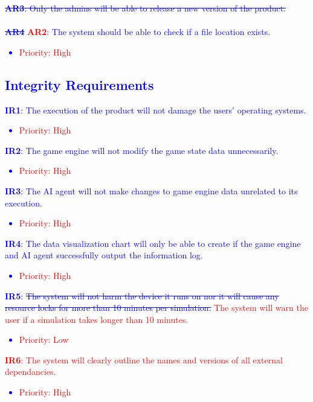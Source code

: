 \documentclass{article}
\begin{document}
\textcolor{blue}{\sout{\textbf{AR3}: Only the admins will be able to release a new version of the product.}\\\\
\textcolor{blue}{\sout{\textbf{AR4}}} \textcolor{red}{\textbf{AR2}}: The system should be able to check if a file location exists.
\begin{itemize}
    \item \textcolor{red}{Priority: High}
\end{itemize}

\subsection{Integrity Requirements}

\textbf{IR1}: The execution of the product will not damage the users' operating systems.
\begin{itemize}
    \item \textcolor{red}{Priority: High}
\end{itemize}
\textbf{IR2}: The game engine will not modify the game state data unnecessarily.
\begin{itemize}
    \item \textcolor{red}{Priority: High}
\end{itemize}
\textbf{IR3}: The AI agent will not make changes to game engine data unrelated to its execution.
\begin{itemize}
    \item \textcolor{red}{Priority: High}
\end{itemize}
\textbf{IR4}: The data visualization chart will only be able to create if the game engine and AI agent successfully output the information log.
\begin{itemize}
    \item \textcolor{red}{Priority: High}
\end{itemize}
\textbf{IR5}: \textcolor{blue}{\sout{The system will not harm the device it runs on nor it will cause any resource locks for more than 10 minutes per simulation.}} \textcolor{red}{The system will warn the user if a simulation takes longer than 10 minutes.}
\begin{itemize}
    \item \textcolor{red}{Priority: Low}
\end{itemize}
\textcolor{red}{\textbf{IR6}: The system will clearly outline the names and versions of all external dependancies.}
\begin{itemize}
    \item \textcolor{red}{Priority: High}
\end{itemize}

}
\end{document}
